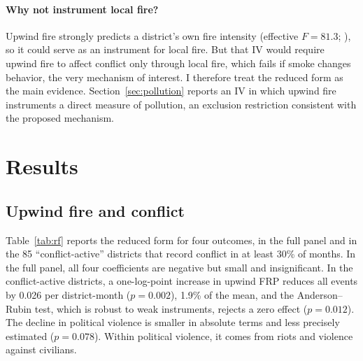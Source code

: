 \documentclass[12pt]{article}
\begin{document}
\paragraph{Why not instrument local fire?} Upwind fire strongly predicts a district's own fire intensity (effective $F = 81.3$; \citealp{montielolea2013}), so it could serve as an instrument for local fire. But that IV would require upwind fire to affect conflict only through local fire, which fails if smoke changes behavior, the very mechanism of interest. I therefore treat the reduced form as the main evidence. Section~\ref{sec:pollution} reports an IV in which upwind fire instruments a direct measure of pollution, an exclusion restriction consistent with the proposed mechanism.

\section{Results}
\label{sec:results}

\subsection{Upwind fire and conflict}

Table~\ref{tab:rf} reports the reduced form for four outcomes, in the full panel and in the 85 ``conflict-active'' districts that record conflict in at least 30\% of months. In the full panel, all four coefficients are negative but small and insignificant. In the conflict-active districts, a one-log-point increase in upwind FRP reduces all events by 0.026 per district-month ($p=0.002$), 1.9\% of the mean, and the Anderson--Rubin test, which is robust to weak instruments, rejects a zero effect ($p=0.012$). The decline in political violence is smaller in absolute terms and less precisely estimated ($p=0.078$). Within political violence, it comes from riots and violence against civilians.
\end{document}
